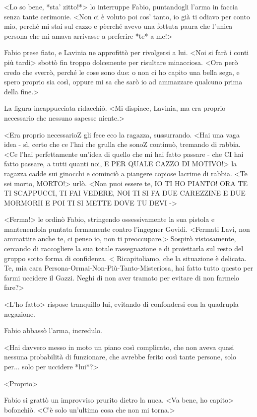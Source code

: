 <Lo so bene, *sta' zitto!*> lo interruppe Fabio, puntandogli l'arma in faccia senza tante cerimonie. <Non ci è voluto poi cos' tanto, io già ti odiavo per conto mio, perché mi stai sul cazzo e pèerché avevo una fottuta paura che l'unica persona che mi amava arrivasse a preferire *te* a me!>

Fabio prese fiato, e Lavinia ne approfittò per rivolgersi a lui. <Noi si farà i conti più tardi> sbottò fin troppo dolcemente per risultare minacciosa. <Ora però credo che sverrò, perché le cose sono due: o non ci ho capito una bella sega, e spero proprio sia così, oppure mi sa che sarò io ad ammazzare qualcuno prima della fine.>

La figura incappucciata ridacchiò. <Mi dispiace, Lavinia, ma era proprio necessario che nessuno sapesse niente.>

<Era proprio necessarioZ gli fece eco la ragazza, sussurrando. <Hai una vaga idea - sì, certo che ce l'hai che grulla che sonoZ continuò, tremando di rabbia. <Ce l'hai perfettamente un'idea di quello che mi hai fatto passare - che CI hai fatto passare, a tutti quanti noi, E PER QUALE CAZZO DI MOTIVO!> la ragazza cadde sui ginocchi e cominciò a piangere copiose lacrime di rabbia. <Te sei morto, MORTO!> urlò. <Non puoi essere te, IO TI HO PIANTO! ORA TE TI SCAPPUCCI, TI FAI VEDERE, NOI TI SI FA DUE CAREZZINE E DUE MORMORII E POI TI SI METTE DOVE TU DEVI ->

<Ferma!> le ordinò Fabio, stringendo ossessivamente la sua pistola e mantenendola puntata fermamente contro l'ingegner Govidi. <Fermati Lavi, non ammattire anche te, ci penso io, non ti preoccupare.> Sospirò vistosamente, cercando di raccogliere la sua totale rassegnazione e di proiettarla sul resto del gruppo sotto forma di confidenza. < Ricapitoliamo, che la situazione è delicata. Te, mia cara Persona-Ormai-Non-Più-Tanto-Misteriosa, hai fatto tutto questo per farmi uccidere il Gazzi. Neghi di non aver tramato per evitare di non farmelo fare?>

<L'ho fatto> rispose tranquillo lui, evitando di confondersi con la quadrupla negazione.

Fabio abbassò l'arma, incredulo.

<Hai davvero messo in moto un piano così complicato, che non aveva quasi nessuna probabilità di funzionare, che avrebbe ferito così tante persone, solo per... solo per uccidere *lui*?>

<Proprio>

Fabio si grattò un improvviso prurito dietro la nuca. <Va bene, ho capito> bofonchiò. <C'è solo un'ultima cosa che non mi torna.>

